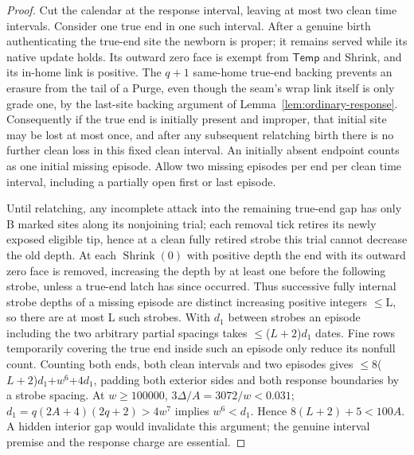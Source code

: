 \begin{proof}


Cut the calendar at the response interval, leaving at most two clean time intervals. Consider one true end in one such interval. After a genuine birth authenticating the true-end site the newborn is proper; it remains served while its native update holds. Its outward zero face is exempt from \(\mathsf{Temp}\) and Shrink, and its in-home link is positive. The \(q+1\) same-home true-end backing prevents an erasure from the tail of a Purge, even though the seam's wrap link itself is only grade one, by the last-site backing argument of Lemma~\ref{lem:ordinary-response}. Consequently if the true end is initially present and improper, that initial site may be lost at most once, and after any subsequent relatching birth there is no further clean loss in this fixed clean interval. An initially absent endpoint counts as one initial missing episode. Allow two missing episodes per end per clean time interval, including a partially open first or last episode.

Until relatching, any incomplete attack into the remaining true-end gap has only B marked sites along its nonjoining trial; each removal tick retires its newly exposed eligible tip, hence at a clean fully retired strobe this trial cannot decrease the old depth. At each \(\operatorname{Shrink}(0)\) with positive depth the end with its outward zero face is removed, increasing the depth by at least one before the following strobe, unless a true-end latch has since occurred. Thus successive fully internal strobe depths of a missing episode are distinct increasing positive integers \(\le\)L, so there are at most L such strobes. With \(d_1\) between strobes an episode including the two arbitrary partial spacings takes \(\le\)(\(L+2\))\(d_1\) dates. Fine rows temporarily covering the true end inside such an episode only reduce its nonfull count. Counting both ends, both clean intervals and two episodes gives \(\le\)8(\(L+2\))\(d_1\)+\(w^6\)+\(4d_1\), padding both exterior sides and both response boundaries by a strobe spacing. At \(w\ge 100000\), \(3\Delta /A=3072/w<0.031\); \(d_1=q(2A+4)(2q+2)>4w^7\) implies \(w^6<d_1\). Hence \(8(L+2)+5<100A\). A hidden interior gap would invalidate this argument; the genuine interval premise and the response charge are essential.


\end{proof}
